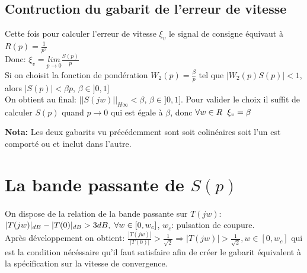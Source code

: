 \documentclass[12pt, a4paper, openany]{report}
\begin{document}
   \begin{center}
    \label{fig4}
  \end{center}
   
  \subsection{Contruction du gabarit de l'erreur de vitesse}
  
  Cette fois pour calculer l'erreur de vitesse $\xi_{v}$ le signal de consigne équivaut à $R(p)=\frac{1}{p^{2}}$\\[0.75cm]
  Donc: \hspace{5mm} $\xi_{v}=\underset{p\longrightarrow 0}{lim}\frac{S(p)}{p}$\\[0.75cm]
  Si on choisit la fonction de pondération $W_{2}(p)=\frac{\beta}{p}$ tel que $|W_{2}(p)S(p)|<1$, alors $|S(p)|<\beta p$, $\beta \in ]0, 1]$\\[0.75cm]
  On obtient au final: \hspace{5mm} $||S(jw)||_{H\infty}<\beta$, $\beta \in ]0, 1]$. Pour valider le choix il suffit de calculer $S(p)$ quand $p\rightarrow0$ qui est égale à $\beta$, donc $\forall w \in R \hspace{2mm} \xi_{v}=\beta$ 
  
  \begin{center}
    \label{fig5}
  \end{center}
  
 \textbf{Nota:} \hspace{2mm} Les deux gabarits vu précédemment sont soit colinéaires soit l'un est comporté ou et inclut dans l'autre.\\
 
 \section{La bande passante de $S(p)$}
 
 \paragraph{}
 On dispose de la relation de la bande passante sur $T(jw)$: $|T(jw)|_{dB}-|T(0)|_{dB}>3dB,\hspace{1mm} \forall w\in[0, w_{c}]$, $w_{c}$: pulsation de coupure.\\
 Après développement on obtient: $\frac{|T(jw)|}{|T(0)|}>\frac{1}{\sqrt{2}} \Rightarrow |T(jw)|>\frac{1}{\sqrt{2}}, w\in[0, w_{c}]$ qui est la condition nécéssaire qu'il faut satisfaire afin de créer le gabarit équivalent à la spécification sur la vitesse de convergence.\\
 
\end{document}
